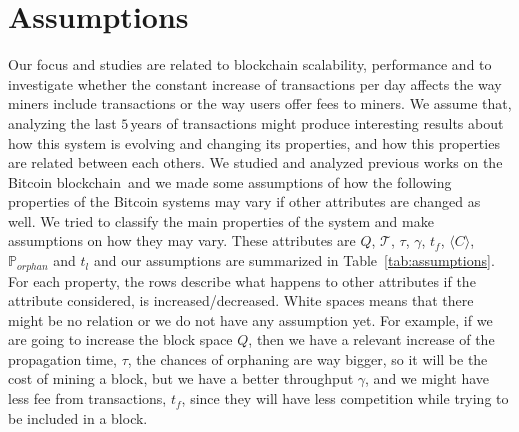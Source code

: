 \documentclass[USenglish]{uit-thesis}
\begin{document}
\section{Assumptions}
\label{sec:assumptions}
Our focus and studies
are related to blockchain scalability, performance and
to investigate whether the constant
increase of transactions per day
affects the way miners include transactions
or the way users offer fees to miners.
We assume that, analyzing the last $5$\,years
of transactions might produce interesting
results about how this system is evolving and changing its
properties, and how this properties are related
between each others.
We studied and analyzed previous works on the Bitcoin
blockchain\,\cite{croman2016, Rizun:2015:blocksizelimit,
	Moser2015, Decker2013IPBN}
and we made some assumptions of how
the following properties of the Bitcoin systems may vary if other
attributes are changed as well. We tried to classify the main
properties of the system and make assumptions on how they
may vary. These attributes are $Q$, $\mathcal{T}$, $\tau$,
$\gamma$, $t_f$, $\langle C\rangle$, $\mathbb{P}_{orphan}$ and $t_l$ and
our assumptions are summarized in Table~\ref{tab:assumptions}. For
each property, the rows describe what happens to other attributes
if the attribute considered, is increased/decreased. White spaces
means that there might be no relation or we do not have any assumption
yet. For example, if we are going to increase the block space $Q$,
then we have a relevant increase of the propagation time, $\tau$,
the chances of orphaning are way bigger, so it will be the cost of mining a block,
but we have a better throughput $\gamma$, and we might have
less fee from transactions, $t_f$, since they will have less competition
while trying to be included in a block.
\end{document}
